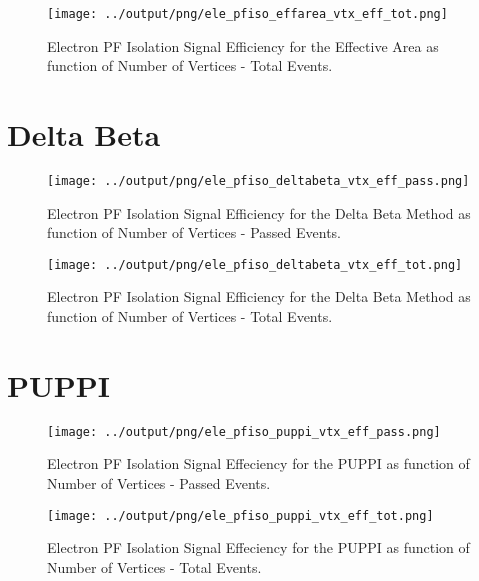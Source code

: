 \documentclass[11pt]{book}
\begin{document}
\begin{figure}[htb]
\centering
\texttt{[image: ../output/png/ele\_pfiso\_effarea\_vtx\_eff\_tot.png]}
\caption{Electron PF Isolation Signal Efficiency for the Effective Area as function of Number of Vertices - Total Events.}
\label{fig:ele_pfiso_vtx_eff_effarea_tot}
\end{figure}





\clearpage

\section{Delta Beta}
\begin{figure}[htb]
\centering
\texttt{[image: ../output/png/ele\_pfiso\_deltabeta\_vtx\_eff\_pass.png]}
\caption{Electron PF Isolation Signal Efficiency for the Delta Beta Method as function of Number of Vertices - Passed Events.}
\label{fig:ele_pfiso_vtx_eff_deltabeta_pass}
\end{figure}

\begin{figure}[htb]
\centering
\texttt{[image: ../output/png/ele\_pfiso\_deltabeta\_vtx\_eff\_tot.png]}
\caption{Electron PF Isolation Signal Efficiency for the Delta Beta Method as function of Number of Vertices - Total Events.}
\label{fig:ele_pfiso_vtx_eff_deltabeta_tot}
\end{figure}



\clearpage

\section{PUPPI}
\begin{figure}[htb]
\centering
\texttt{[image: ../output/png/ele\_pfiso\_puppi\_vtx\_eff\_pass.png]}
\caption{Electron PF Isolation Signal Effeciency for the PUPPI as function of Number of Vertices - Passed Events.}
\label{fig:ele_pfiso_vtx_eff_puppi_pass}
\end{figure}

\begin{figure}[htb]
\centering
\texttt{[image: ../output/png/ele\_pfiso\_puppi\_vtx\_eff\_tot.png]}
\caption{Electron PF Isolation Signal Effeciency for the PUPPI as function of Number of Vertices - Total Events.}
\label{fig:ele_pfiso_vtx_eff_puppi_tot}
\end{figure}
\end{document}

